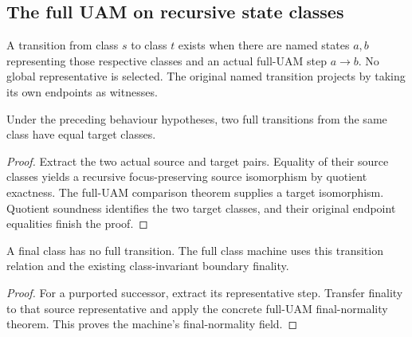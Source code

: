 
\subsection{The full UAM on recursive state classes}
\begin{definition}
A transition from class $s$ to class $t$ exists when there are named states
$a,b$ representing those respective classes and an actual full-UAM step
$a\to b$. No global representative is selected. The original named transition
projects by taking its own endpoints as witnesses.
\end{definition}



\begin{theorem}
Under the preceding behaviour hypotheses, two full transitions from the same
class have equal target classes.
\end{theorem}
\begin{proof}
Extract the two actual source and target pairs. Equality of their source
classes yields a recursive focus-preserving source isomorphism by quotient
exactness. The full-UAM comparison theorem supplies a target isomorphism.
Quotient soundness identifies the two target classes, and their original
endpoint equalities finish the proof.
\end{proof}
\begin{lemma}
A final class has no full transition. The full class machine uses this
transition relation and the existing class-invariant boundary finality.
\end{lemma}
\begin{proof}
For a purported successor, extract its representative step. Transfer finality
to that source representative and apply the concrete full-UAM final-normality
theorem. This proves the machine's final-normality field.
\end{proof}




